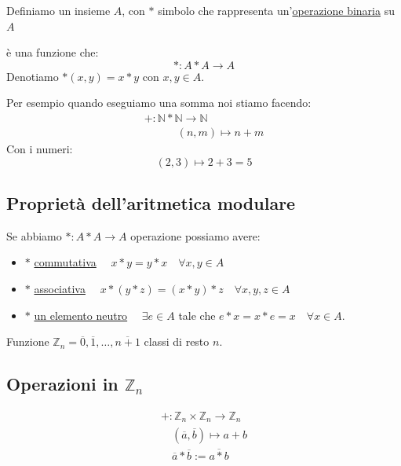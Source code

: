 \documentclass{article}
\theoremstyle{definition}
\begin{document}
Definiamo un insieme $ A $, con $ * $ simbolo che rappresenta un'\underline{operazione binaria} su $ A $ \par
è una funzione che:
\begin{equation*}
        * : A * A \to A
\end{equation*}
Denotiamo $*(x,y) = x*y$ con $ x,y \in A $. \par
Per esempio quando eseguiamo una somma noi stiamo facendo:
\begin{align*}
        + : \mathbb{N}*\mathbb{N} \to \mathbb{N} \\
        \quad \quad \quad (n,m) \mapsto n + m
\end{align*}
Con i numeri:
\begin{equation*}
        (2,3) \mapsto 2 + 3 = 5
\end{equation*}



\subsection{Proprietà dell'aritmetica modulare}\label{sec:proprieta_dell_aritmetica_modulare}
Se abbiamo $ * : A*A \to A $ operazione possiamo avere:
\begin{itemize}
        \item $ * $  \underline{commutativa} $ \quad x * y = y * x \quad \forall x,y \in A $
        \item $ * $  \underline{associativa} $ \quad x * (y * z) = (x * y) * z \quad \forall x,y,z \in A$
        \item $ * $ \underline{un elemento neutro} $ \quad \exists e \in A $ tale che $ e * x= x * e = x  \quad  \forall x \in A$. 
\end{itemize}
Funzione $ \mathbb{Z}_n = {\overline{0}, \overline{1},\ldots, \overline{n + 1}} $ classi di resto $ n $. 


\subsection{Operazioni in $\mathbb{Z}_n$}\label{sec:operazioni_in_Zn}
\begin{align*}
        + : \mathbb{Z}_n \times \mathbb{Z}_n \to \mathbb{Z}_n \\
        \quad (\overline{a}, \overline{b}) \mapsto a + b \\
        \quad \overline{a} * \overline{b} := \overline{a * b}
\end{align*}
\end{document}
